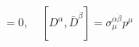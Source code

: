 \begin{equation} 
[\bar{D}_{\dot{\beta}}, p_{\mu}] = 0, ~~~~~ 
[D^{\alpha}, \bar{D}^{\dot{\beta}}] = \sigma_{\mu}^{\alpha \dot{\beta}} 
p^{\mu} 
\end{equation} 
